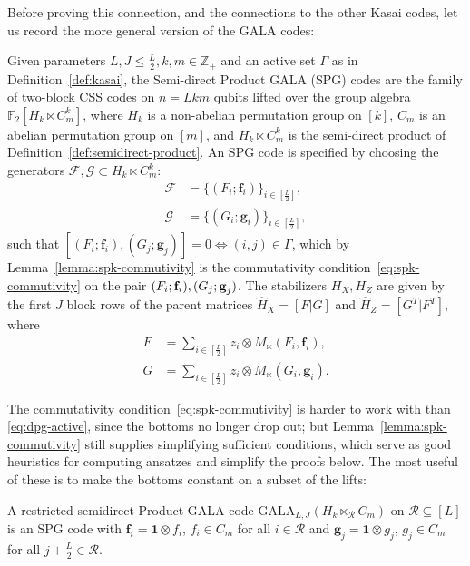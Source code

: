 Before proving this connection, and the connections to the other Kasai codes, let us record the more general version of the GALA codes:
\begin{definition}\label{def:spg-code}
Given parameters $L, J \leq \tfrac{L}{2}, k, m \in \mathbb{Z}_+$ and an active set $\Gamma$ as in Definition~\ref{def:kasai}, the Semi-direct Product GALA (SPG) codes are the family of two-block CSS codes on $n = Lkm$ qubits lifted over the group algebra $\mathbb F_2[H_k\ltimes C^k_m]$, where $H_k$ is a non-abelian permutation group on $[k]$, $C_m$ is an abelian permutation group on $[m]$, and $H_k\ltimes C_m^k$ is the semi-direct product of Definition~\ref{def:semidirect-product}. An SPG code is specified by choosing the generators $\mathcal{F},\mathcal{G}\subset H_k\ltimes C^k_m$:
\begin{align*}
    \mathcal{F} &=  \{(F_i;\textbf{f}_i )\}_{i\in[\frac L2]},\\
    \mathcal{G} &= \{(G_i; \textbf{g}_i)\}_{i\in[\frac L2]},
\end{align*}
such that $[(F_i;\textbf{f}_i),(G_j;\textbf{g}_j)] = 0\iff (i,j)\in\Gamma$, which by Lemma~\ref{lemma:spk-commutivity} is the commutativity condition~\eqref{eq:spk-commutivity} on the pair $(F_i;\textbf f_i), (G_j;\textbf g_j)$. The stabilizers $ H_X, {H}_Z$ are given by the first $J$ block rows of the parent matrices $\hat H_X = [F|G]$ and $\hat H_Z = [G^T|F^T]$, where
\begin{align*}
    F &= \sum_{i\in [\frac{L}{2}]} z_i\otimes M_\ltimes(F_{i}, \textbf{f}_{i}) ,\\
    G &= \sum_{i\in [\frac{L}{2}]} z_i\otimes M_\ltimes(G_{i},\textbf{g}_{i}).
\end{align*}
\end{definition}

The commutativity condition~\eqref{eq:spk-commutivity} is harder to work with than \eqref{eq:dpg-active}, since the bottoms no longer drop out; but Lemma~\ref{lemma:spk-commutivity} still supplies simplifying sufficient conditions, which serve as good heuristics for computing ansatzes and simplify the proofs below. The most useful of these is to make the bottoms constant on a subset of the lifts:

\begin{definition}\label{def:SPG-restricted}
A restricted semidirect Product GALA code $\mathrm {GALA}_{L,J}(H_k\ltimes_\mathcal{R} C_m)$ on $\mathcal{R}\subseteq [L]$ is an SPG code with  $\textbf{f}_i = \textbf{1}\otimes f_i$, $f_i\in C_m$ for all $i\in \mathcal{R}$ and $\textbf{g}_j = \textbf{1}\otimes g_j$, $g_j\in C_m$  for all  $j + \frac L2\in \mathcal{R}$.
\end{definition}


